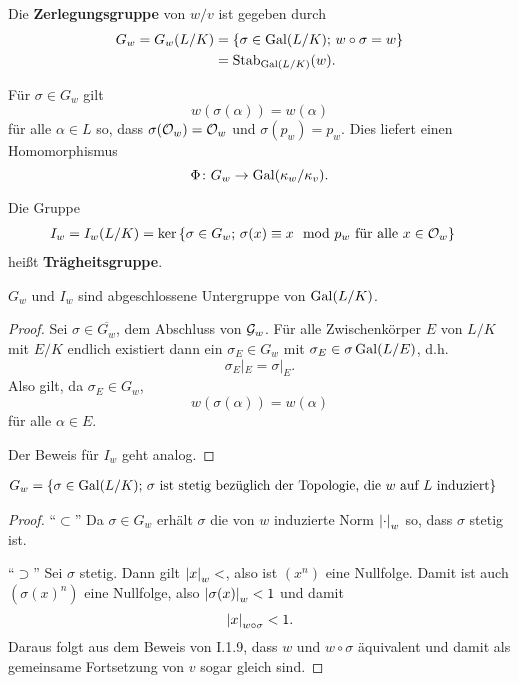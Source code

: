 \begin{defi}
	Die \textbf{Zerlegungsgruppe} von $w/v$ ist gegeben durch
	\begin{align*}
	G_w
	=G_w(L/K)
	&= \left\{ \sigma \in \operatorname{Gal}(L/K); \, w\circ\sigma = w \right\} \\
	&= \operatorname{Stab}_{\operatorname{Gal}(L/K)}(w).
	\end{align*}
\end{defi}

\begin{Bem}
	Für $\sigma \in G_w$ gilt
	\[ w(\sigma(\alpha)) = w(\alpha)
	\]
	für alle $\alpha \in L$ so, dass $\sigma(\mathcal{O}_w) = \mathcal{O}_w$ und $\sigma(p_w) = p_w$.
	Dies liefert einen Homomorphismus
	\[ \Phi \colon G_w \to \operatorname{Gal}(\kappa_w/\kappa_v).
	\]
\end{Bem}

\begin{defi} Die Gruppe
	\begin{align*}
	I_w 
	=I_w(L/K)
	&= \ker \left\{
	\sigma \in G_w; \, \sigma(x) \equiv x \mod p_w \text{ für alle } x \in \mathcal{O}_w
	\right\}
	\end{align*}
	heißt \textbf{Trägheitsgruppe}.
\end{defi}


\begin{Prop}
	$G_w$ und $I_w$ sind abgeschlossene Untergruppe von $\operatorname{Gal}(L/K)$.
\end{Prop}


\begin{proof}
	Sei $\sigma \in \overline{G_w}$, dem Abschluss von $\mathcal{G}_w$. Für alle Zwischenkörper $E$ von $L/K$ mit $E/K$ endlich existiert dann ein $\sigma_E \in G_w$ mit
	$\sigma_E \in \sigma \operatorname{Gal}(L/E)$, d.h.
	\[ \sigma_E|_E = \sigma|_E.
	\]
	Also gilt, da $\sigma_E \in G_w$,
	\[ w(\sigma(\alpha)) = w(\alpha)
	\]
	für alle $\alpha \in E$.
	
	\bigskip
	Der Beweis für $I_w$ geht analog.
\end{proof}

\begin{Prop}
	\begin{align*}
	G_w
	&=
	\left\{ 
	\sigma \in \operatorname{Gal}(L/K); \,\text{$\sigma$ ist stetig bezüglich der Topologie, die $w$ auf $L$ induziert}
	\right\}
	\end{align*}
\end{Prop}

\begin{proof}
	\enquote{$\subset$} Da $\sigma \in G_w$ erhält $\sigma$ die von $w$ induzierte Norm $\left|{\cdot}\right|_w$ so, dass $\sigma$ stetig ist.
	
	\bigskip \enquote{$\supset$} Sei $\sigma$ stetig. Dann gilt $\left|{x}\right|_w <$, also ist $(x^n)$ eine Nullfolge. Damit ist auch $(\sigma(x)^n)$ eine Nullfolge, also
	$\left|{\sigma(x)}\right|_w <1$ und damit
	\[ \left|{x}\right|_{w\circ \sigma} < 1.
	\]
	Daraus folgt aus dem Beweis von I.1.9, dass $w$ und $w\circ\sigma$ äquivalent und damit als gemeinsame Fortsetzung von $v$ sogar gleich sind.
\end{proof}


